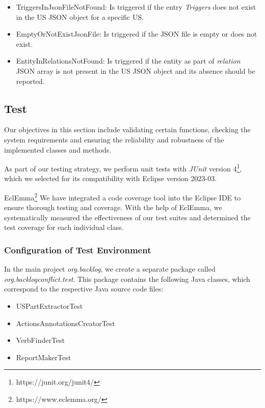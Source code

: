 \begin{itemize}
	\item TriggersInJsonFileNotFound: Is triggered if the entry \textit{Triggers} does not exist in the US JSON object for a specific US.
	
	\item EmptyOrNotExistJsonFile: Is triggered if the JSON file is empty or does not exist.
	
	\item EntityInRelationsNotFound: Is triggered if the entity as part of \textit{relation} JSON array is not present in the US JSON object and its absence should be reported.
	
\end{itemize}



\subsection{Test}\label{conflict_test}
Our objectives in this section include validating certain functions, checking the system requirements and ensuring the reliability and robustness of the implemented classes and methods.

As part of our testing strategy, we perform unit tests with \textit{JUnit} version 4\footnote{https://junit.org/junit4/}, which we selected for its compatibility with Eclipse version 2023-03. 

EclEmma\footnote{https://www.eclemma.org/} We have integrated a code coverage tool into the Eclipse IDE to ensure thorough testing and coverage. With the help of EclEmma, we systematically measured the effectiveness of our test suites and determined the test coverage for each individual class.
\subsubsection*{Configuration of Test Environment}
In the main project \textit{org.backlog}, we create a separate package called \textit{org.backlogconflict.test}. This package contains the following Java classes, which correspond to the respective Java source code files:
\begin{itemize}
	
	\item USPartExtractorTest
	
	\item ActionsAnnotationsCreatorTest
	
	\item VerbFinderTest
	
	\item ReportMakerTest
	
\end{itemize}
